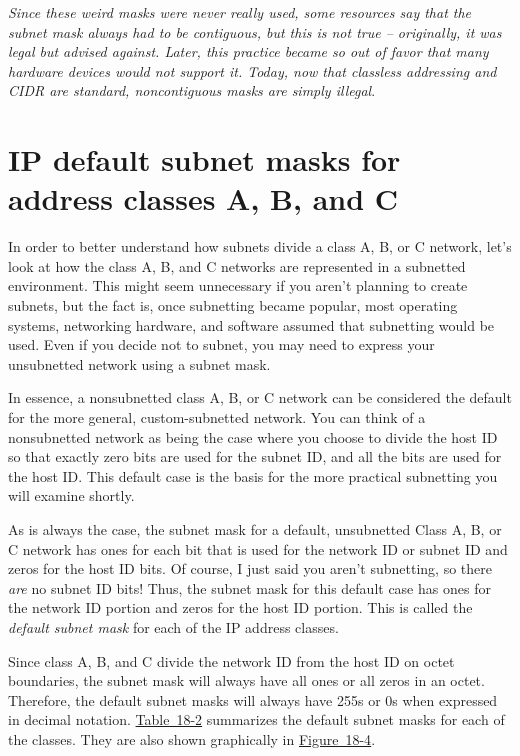 {\emph{Since these weird masks were never really used, some resources
say that the subnet mask always had to be contiguous, but this is not
true -- originally, it was legal but advised against. Later, this
practice became so out of favor that many hardware devices would not
support it. Today, now that classless addressing and CIDR are standard,
noncontiguous masks are simply
illegal}}.




\section{IP default subnet masks for address classes A, B, and C}

In order to better understand how subnets divide a class A, B, or C network, let's
look at how the class A, B, and C networks are represented in a
subnetted environment. This might seem unnecessary if you aren't
planning to create subnets, but the fact is, once subnetting became
popular, most operating systems, networking hardware, and software
assumed that subnetting would be used. Even if you decide not to subnet,
you may need to express your unsubnetted network using a subnet mask.

In essence, a nonsubnetted class A, B, or C network can be considered
the default for the more general, custom-subnetted network. You can
think of a nonsubnetted network as being the case where you choose to
divide the host ID so that exactly zero bits are used for the subnet ID,
and all the bits are used for the host ID. This default case is the
basis for the more practical subnetting you will examine shortly.

As is always the case, the subnet mask for a default, unsubnetted Class
A, B, or C network has ones for each bit that is used for the network ID
or subnet ID and zeros for the host ID bits. Of course, I just said you
aren't subnetting, so there {\emph{are}} no subnet ID bits! Thus, the
subnet mask for this default case has ones for the network ID portion
and zeros for the host ID portion. This is called the {\emph{default
subnet mask}} for each of the IP address classes.

Since class A, B, and C divide the network ID from the host ID on octet
boundaries, the subnet mask will always have all ones or all zeros in an
octet. Therefore, the default subnet masks will always have 255s or 0s
when expressed in decimal notation.
\protect\hyperlink{ch18s04.htmlux5cux23default_subnet_masks_for_class_a_class_b}{Table~18-2}
summarizes the default subnet masks for each of the classes. They are
also shown graphically in
\protect\hyperlink{ch18s04.htmlux5cux23default_subnet_masks_for_class_a_c-id001}{Figure~18-4}.



